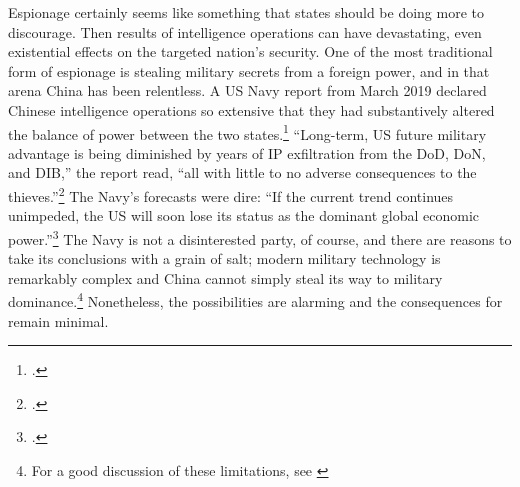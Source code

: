 \documentclass[14pt]{extarticle}
\begin{document}
Espionage certainly seems like something that states should be doing more to discourage. Then results of intelligence operations can have devastating, even existential effects on the targeted nation's security. One of the most traditional form of espionage is stealing military secrets from a foreign power, and in that arena China has been relentless. A US Navy report from March 2019 declared Chinese intelligence operations so extensive that they had substantively altered the balance of power between the two states.\footcite{lubold_navy_2019} ``Long-term, US future military advantage is being diminished by years of IP exfiltration from the DoD, DoN, and DIB,'' the report read, ``all with little to no adverse consequences to the thieves.''\footcite[p.~6]{bayer_cybersecurity_2019} The Navy's forecasts were dire: ``If the current trend continues unimpeded, the US will soon lose its status as the dominant global economic power.''\footcite[p.~5]{bayer_cybersecurity_2019} The Navy is not a disinterested party, of course, and there are reasons to take its conclusions with a grain of salt; modern military technology is remarkably complex and China cannot simply steal its way to military dominance.\footnote{For a good discussion of these limitations, see \cite{gilli_why_2019}} Nonetheless, the possibilities are alarming and the consequences for remain minimal.





\end{document}
